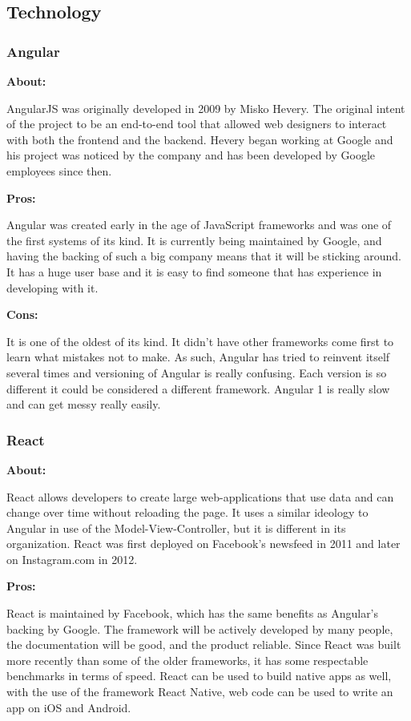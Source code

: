 \documentclass[draftclsnofoot,onecolumn,letterpaper,10pt,compsoc]{IEEEtran}
\begin{document}
  \subsection{Technology}
  	\subsubsection{Angular}

    \textbf{About:}

    AngularJS was originally developed in 2009 by Misko Hevery\cite{AngularIntroduction}.
    The original intent of the project to be an end-to-end tool that allowed web designers to interact with both the frontend and the backend.\cite{HistoryOfAngular}
    Hevery began working at Google and his project was noticed by the company and has been developed by Google employees since then.

    \noindent \textbf{Pros:}

    Angular was created early in the age of JavaScript frameworks and was one of the first systems of its kind.
    It is currently being maintained by Google, and having the backing of such a big company means that it will be sticking around.
    It has a huge user base and it is easy to find someone that has experience in developing with it.

    \noindent \textbf{Cons:}

    It is one of the oldest of its kind.
    It didn't have other frameworks come first to learn what mistakes not to make.
    As such, Angular has tried to reinvent itself several times and versioning of Angular is really confusing. Each version is so different it could be considered a different framework.
    Angular 1 is really slow\cite{SpeedReport} and can get messy really easily.


  	\subsubsection{React}
    \textbf{About:}

    React allows developers to create large web-applications that use data and can change over time without reloading the page.
    It uses a similar ideology to Angular in use of the Model-View-Controller, but it is different in its organization.
    React was first deployed on Facebook's newsfeed in 2011 and later on Instagram.com in 2012.

    \noindent \textbf{Pros:}

    React is maintained by Facebook, which has the same benefits as Angular's backing by Google.
    The framework will be actively developed by many people, the documentation will be good, and the product reliable.
    Since React was built more recently than some of the older frameworks, it has some respectable benchmarks in terms of speed.\cite{SpeedReport}
    React can be used to build native apps as well, with the use of the framework React Native, web code can be used to write an app on iOS and Android.
\end{document}
